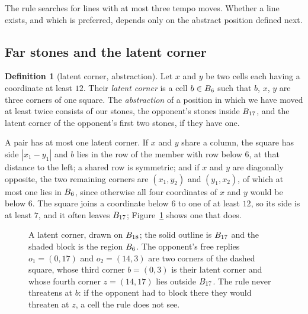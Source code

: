 \documentclass[11pt]{amsart}
\theoremstyle{definition}
\newtheorem{definition}[theorem]{Definition}
\theoremstyle{remark}
\begin{document}
The rule searches for lines with at most three tempo moves. Whether a
line exists, and which is preferred, depends only on the abstract
position defined next.

\subsection{Far stones and the latent corner}

\begin{definition}[latent corner, abstraction]\label{def:latent}
Let $x$ and $y$ be two cells each having a coordinate at least $12$.
Their \emph{latent corner} is a cell $b \in B_6$ such that
$b$, $x$, $y$ are three corners of one square. The \emph{abstraction}
of a position in which we have moved at least twice consists of our
stones, the opponent's stones inside $B_{17}$, and the latent
corner of the opponent's first two stones, if they have one.
\end{definition}

A pair has at most one latent corner. If $x$ and $y$ share a column,
the square has side $|x_1 - y_1|$ and $b$ lies in the row of the
member with row below $6$, at that distance to the left; a shared row
is symmetric; and if $x$ and $y$ are diagonally opposite, the two
remaining corners are $(x_1, y_2)$ and $(y_1, x_2)$, of which at most
one lies in $B_6$, since otherwise all four coordinates of $x$
and $y$ would be below $6$. The square joins a coordinate below $6$ to
one of at least $12$, so its side is at least $7$, and it often leaves
$B_{17}$; Figure~\ref{fig:latent} shows one that does.

\begin{figure}[ht]
\centering
{}
\caption{A latent corner, drawn on $B_{18}$; the solid outline is
$B_{17}$ and the shaded block is the region $B_6$. The
opponent's free replies $o_1 = (0,17)$ and $o_2 = (14,3)$ are two
corners of the dashed square, whose third corner $b = (0,3)$ is their
latent corner and whose fourth corner $z = (14,17)$ lies outside
$B_{17}$. The rule never threatens at $b$: if the opponent had to
block there they would threaten at $z$, a cell the rule does not see.}
\label{fig:latent}
\end{figure}
\end{document}
